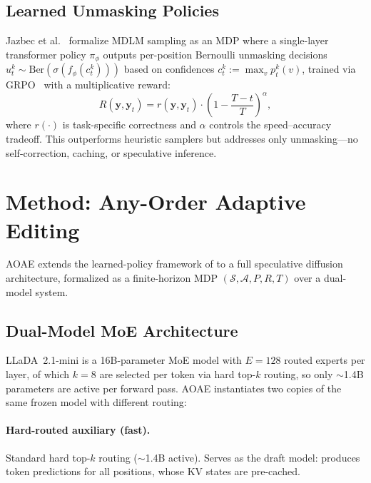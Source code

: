 \documentclass[11pt]{article}
\newcommand{\cS}{\mathcal{S}}
\newcommand{\cA}{\mathcal{A}}
\newcommand{\by}{\mathbf{y}}
\begin{document}
\subsection{Learned Unmasking Policies}
\label{sec:bg_rl}

Jazbec et al.~\cite{jazbec2025learning} formalize MDLM sampling as an MDP where a single-layer transformer policy $\pi_\phi$ outputs per-position Bernoulli unmasking decisions $u_t^k \sim \text{Ber}(\sigma(f_\phi(c_t^k)))$ based on confidences $c_t^k := \max_v p_t^k(v)$, trained via GRPO~\cite{shao2024deepseekmath} with a multiplicative reward:
\begin{equation}
    R(\by, \by_t) = r(\by, \by_t) \cdot \left(1 - \frac{T - t}{T}\right)^\alpha,
    \label{eq:rl_reward}
\end{equation}
where $r(\cdot)$ is task-specific correctness and $\alpha$ controls the speed--accuracy tradeoff.
This outperforms heuristic samplers but addresses only unmasking---no self-correction, caching, or speculative inference.

\section{Method: Any-Order Adaptive Editing}
\label{sec:method}

AOAE extends the learned-policy framework of  to a full speculative diffusion architecture, formalized as a finite-horizon MDP $(\cS, \cA, P, R, T)$ over a dual-model system.

\subsection{Dual-Model MoE Architecture}
\label{sec:soft_moe}

LLaDA~2.1-mini is a 16B-parameter MoE model with $E{=}128$ routed experts per layer, of which $k{=}8$ are selected per token via hard top-$k$ routing, so only ${\sim}$1.4B parameters are active per forward pass.
AOAE instantiates two copies of the same frozen model with different routing:

\paragraph{Hard-routed auxiliary (fast).}
Standard hard top-$k$ routing (${\sim}$1.4B active).
Serves as the draft model: produces token predictions for all positions, whose KV states are pre-cached.
\end{document}
